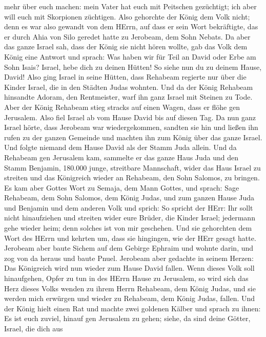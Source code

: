mehr über euch machen: mein Vater hat euch mit Peitschen gezüchtigt; ich
aber will euch mit Skorpionen züchtigen.  Also gehorchte
der König dem Volk nicht; denn es war also gewandt von dem HErrn, auf
dass er sein Wort bekräftigte, das er durch Ahia von Silo geredet hatte
zu Jerobeam, dem Sohn Nebats.  Da aber das ganze Israel
sah, dass der König sie nicht hören wollte, gab das Volk dem König eine
Antwort und sprach: Was haben wir für Teil an David oder Erbe am Sohn
Isais? Israel, hebe dich zu deinen Hütten! So siehe nun du zu deinem
Hause, David! Also ging Israel in seine Hütten,  dass
Rehabeam regierte nur über die Kinder Israel, die in den Städten Judas
wohnten.  Und da der König Rehabeam hinsandte Adoram, den
Rentmeister, warf ihn ganz Israel mit Steinen zu Tode. Aber der König
Rehabeam stieg stracks auf einen Wagen, dass er flöhe gen Jerusalem.
 Also fiel Israel ab vom Hause David bis auf diesen Tag.
 Da nun ganz Israel hörte, dass Jerobeam war
wiedergekommen, sandten sie hin und ließen ihn rufen zu der ganzen
Gemeinde und machten ihn zum König über das ganze Israel. Und folgte
niemand dem Hause David als der Stamm Juda allein.  Und da
Rehabeam gen Jerusalem kam, sammelte er das ganze Haus Juda und den
Stamm Benjamin, 180.000 junge, streitbare Mannschaft, wider das Haus
Israel zu streiten und das Königreich wieder an Rehabeam, den Sohn
Salomos, zu bringen.  Es kam aber Gottes Wort zu Semaja,
dem Mann Gottes, und sprach:  Sage Rehabeam, dem Sohn
Salomos, dem König Judas, und zum ganzen Hause Juda und Benjamin und dem
anderen Volk und sprich:  So spricht der HErr: Ihr sollt
nicht hinaufziehen und streiten wider eure Brüder, die Kinder Israel;
jedermann gehe wieder heim; denn solches ist von mir geschehen. Und sie
gehorchten dem Wort des HErrn und kehrten um, dass sie hingingen, wie
der HErr gesagt hatte.  Jerobeam aber baute Sichem auf dem
Gebirge Ephraim und wohnte darin, und zog von da heraus und baute Pnuel.
 Jerobeam aber gedachte in seinem Herzen: Das Königreich
wird nun wieder zum Hause David fallen.  Wenn dieses Volk
soll hinaufgehen, Opfer zu tun in des HErrn Hause zu Jerusalem, so wird
sich das Herz dieses Volks wenden zu ihrem Herrn Rehabeam, dem König
Judas, und sie werden mich erwürgen und wieder zu Rehabeam, dem König
Judas, fallen.  Und der König hielt einen Rat und machte
zwei goldenen Kälber und sprach zu ihnen: Es ist euch zuviel, hinauf gen
Jerusalem zu gehen; siehe, da sind deine Götter, Israel, die dich aus
